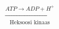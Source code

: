 \documentclass[preview]{standalone}
\begin{document}
\begin{align*}
\xrightarrow[\text{Heksoosi kinaas}]{ATP \rightarrow ADP + H^{+}}
\end{align*}
\end{document}
